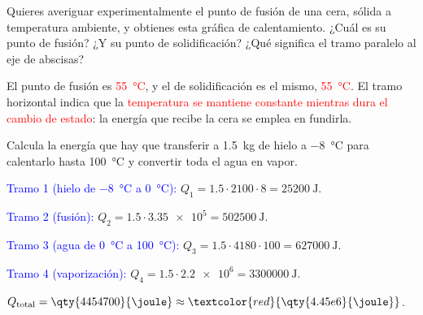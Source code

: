 \begin{exercise}
    Quieres averiguar experimentalmente el punto de fusión de una cera, sólida a temperatura ambiente, y obtienes esta gráfica de calentamiento. ¿Cuál es su punto de fusión? ¿Y su punto de solidificación? ¿Qué significa el tramo paralelo al eje de abscisas?
    \begin{center}
    \end{center}
    \begin{solu}
        El punto de fusión es \textcolor{red}{\qty{55}{\degreeCelsius}}, y el de solidificación es el mismo, \textcolor{red}{\qty{55}{\degreeCelsius}}. El tramo horizontal indica que la \textcolor{red}{temperatura se mantiene constante mientras dura el cambio de estado}: la energía que recibe la cera se emplea en fundirla.
    \end{solu}
\end{exercise}

\begin{exercise}
    Calcula la energía que hay que transferir a \qty{1.5}{\kg} de hielo a \qty{-8}{\degreeCelsius} para calentarlo hasta \qty{100}{\degreeCelsius} y convertir toda el agua en vapor.
    \begin{solu}
        \textcolor{blue}{Tramo 1 (hielo de \qty{-8}{\degreeCelsius} a \qty{0}{\degreeCelsius}):} \(Q_1 = \num{1.5} \cdot 2100 \cdot 8 = \qty{25200}{\joule}\).

        \textcolor{blue}{Tramo 2 (fusión):} \(Q_2 = \num{1.5} \cdot \num{3.35e5} = \qty{502500}{\joule}\).

        \textcolor{blue}{Tramo 3 (agua de \qty{0}{\degreeCelsius} a \qty{100}{\degreeCelsius}):} \(Q_3 = \num{1.5} \cdot 4180 \cdot 100 = \qty{627000}{\joule}\).

        \textcolor{blue}{Tramo 4 (vaporización):} \(Q_4 = \num{1.5} \cdot \num{2.2e6} = \qty{3300000}{\joule}\).

        \(Q_{\text{total}} = \qty{4454700}{\joule} \approx \textcolor{red}{\qty{4.45e6}{\joule}}\).
    \end{solu}
\end{exercise}

